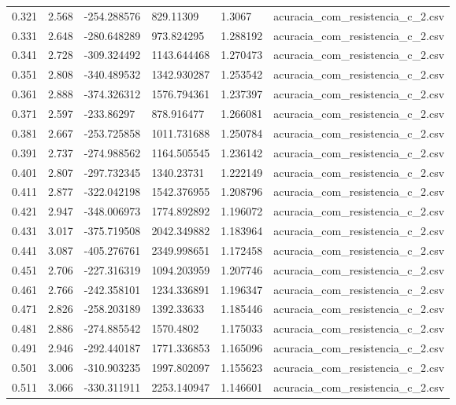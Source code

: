 \begin{table}
\begin{tabular}{llllll}
0.321 & 2.568 & -254.288576 & 829.11309 & 1.3067 & acuracia\_com\_resistencia\_c\_2.csv \\
0.331 & 2.648 & -280.648289 & 973.824295 & 1.288192 & acuracia\_com\_resistencia\_c\_2.csv \\
0.341 & 2.728 & -309.324492 & 1143.644468 & 1.270473 & acuracia\_com\_resistencia\_c\_2.csv \\
0.351 & 2.808 & -340.489532 & 1342.930287 & 1.253542 & acuracia\_com\_resistencia\_c\_2.csv \\
0.361 & 2.888 & -374.326312 & 1576.794361 & 1.237397 & acuracia\_com\_resistencia\_c\_2.csv \\
0.371 & 2.597 & -233.86297 & 878.916477 & 1.266081 & acuracia\_com\_resistencia\_c\_2.csv \\
0.381 & 2.667 & -253.725858 & 1011.731688 & 1.250784 & acuracia\_com\_resistencia\_c\_2.csv \\
0.391 & 2.737 & -274.988562 & 1164.505545 & 1.236142 & acuracia\_com\_resistencia\_c\_2.csv \\
0.401 & 2.807 & -297.732345 & 1340.23731 & 1.222149 & acuracia\_com\_resistencia\_c\_2.csv \\
0.411 & 2.877 & -322.042198 & 1542.376955 & 1.208796 & acuracia\_com\_resistencia\_c\_2.csv \\
0.421 & 2.947 & -348.006973 & 1774.892892 & 1.196072 & acuracia\_com\_resistencia\_c\_2.csv \\
0.431 & 3.017 & -375.719508 & 2042.349882 & 1.183964 & acuracia\_com\_resistencia\_c\_2.csv \\
0.441 & 3.087 & -405.276761 & 2349.998651 & 1.172458 & acuracia\_com\_resistencia\_c\_2.csv \\
0.451 & 2.706 & -227.316319 & 1094.203959 & 1.207746 & acuracia\_com\_resistencia\_c\_2.csv \\
0.461 & 2.766 & -242.358101 & 1234.336891 & 1.196347 & acuracia\_com\_resistencia\_c\_2.csv \\
0.471 & 2.826 & -258.203189 & 1392.33633 & 1.185446 & acuracia\_com\_resistencia\_c\_2.csv \\
0.481 & 2.886 & -274.885542 & 1570.4802 & 1.175033 & acuracia\_com\_resistencia\_c\_2.csv \\
0.491 & 2.946 & -292.440187 & 1771.336853 & 1.165096 & acuracia\_com\_resistencia\_c\_2.csv \\
0.501 & 3.006 & -310.903235 & 1997.802097 & 1.155623 & acuracia\_com\_resistencia\_c\_2.csv \\
0.511 & 3.066 & -330.311911 & 2253.140947 & 1.146601 & acuracia\_com\_resistencia\_c\_2.csv \\

\end{tabular}
\end{table}
